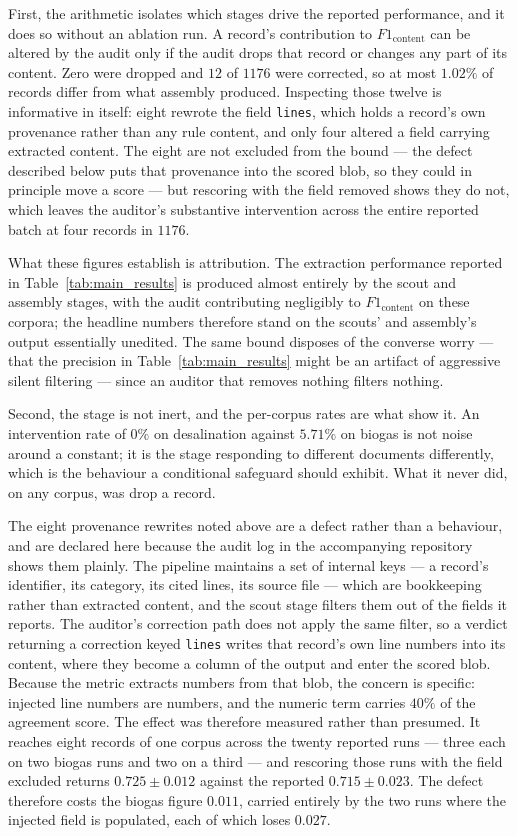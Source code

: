 \documentclass[11pt]{article}
\begin{document}
First, the arithmetic isolates which stages drive the reported performance, and
it does so without an ablation run. A record's contribution to
$F1_{\text{content}}$ can be altered by the audit only if the audit drops that
record or changes any part of its content. Zero were dropped and $12$ of $1176$
were corrected, so at most $1.02\%$ of records differ from what assembly
produced. Inspecting those twelve is informative in itself: eight rewrote the
field \texttt{lines}, which holds a record's own provenance rather than any rule
content, and only four altered a field carrying extracted content. The eight are
not excluded from the bound --- the defect described below puts that provenance
into the scored blob, so they could in principle move a score --- but rescoring
with the field removed shows they do not, which leaves the auditor's substantive
intervention across the entire reported batch at four records in $1176$.

What these figures establish is attribution. The extraction performance reported
in Table~\ref{tab:main_results} is produced almost entirely by the scout and
assembly stages, with the audit contributing negligibly to $F1_{\text{content}}$
on these corpora; the headline numbers therefore stand on the scouts' and
assembly's output essentially unedited. The same bound disposes of the converse
worry --- that the precision in Table~\ref{tab:main_results} might be an
artifact of aggressive silent filtering --- since an auditor that removes
nothing filters nothing.

Second, the stage is not inert, and the per-corpus rates are what show it. An
intervention rate of $0\%$ on desalination against $5.71\%$ on biogas is not
noise around a constant; it is the stage responding to different documents
differently, which is the behaviour a conditional safeguard should exhibit. What
it never did, on any corpus, was drop a record.

The eight provenance rewrites noted above are a defect rather than a behaviour,
and are declared here because the audit log in the accompanying repository shows
them plainly. The pipeline maintains a set of internal keys --- a record's
identifier, its category, its cited lines, its source file --- which are
bookkeeping rather than extracted content, and the scout stage filters them out
of the fields it reports. The auditor's correction path does not apply the same
filter, so a verdict returning a correction keyed \texttt{lines} writes that
record's own line numbers into its content, where they become a column of the
output and enter the scored blob. Because the metric extracts numbers from that
blob, the concern is specific: injected line numbers are numbers, and the
numeric term carries $40\%$ of the agreement score. The effect was therefore
measured rather than presumed. It reaches eight records of one corpus across the
twenty reported runs --- three each on two biogas runs and two on a third ---
and rescoring those runs with the field excluded returns $0.725 \pm 0.012$
against the reported $0.715 \pm 0.023$. The defect therefore costs the biogas
figure $0.011$, carried entirely by the two runs where the injected field is
populated, each of which loses $0.027$.
\end{document}
